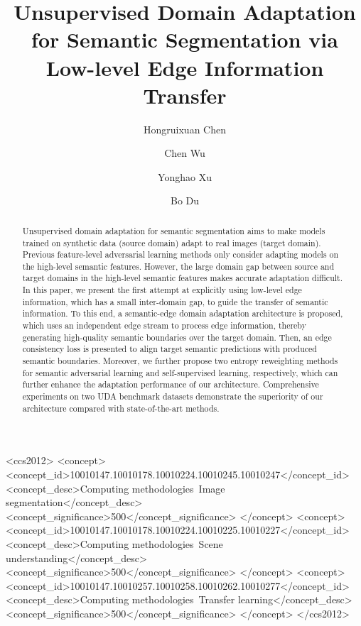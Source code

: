 \documentclass[sigconf]{acmart}
\begin{document}
\title{Unsupervised Domain Adaptation for Semantic Segmentation via Low-level Edge Information Transfer}

\author{Hongruixuan Chen}

\author{Chen Wu}

\author{Yonghao Xu}


\author{Bo Du}





\begin{abstract}
    Unsupervised domain adaptation for semantic segmentation aims to make models trained on synthetic data (source domain) adapt to real images (target domain). Previous feature-level adversarial learning methods only consider adapting models on the high-level semantic features. However, the large domain gap between source and target domains in the high-level semantic features makes accurate adaptation difficult. In this paper, we present the first attempt at explicitly using low-level edge information, which has a small inter-domain gap, to guide the transfer of semantic information. To this end, a semantic-edge domain adaptation architecture is proposed, which uses an independent edge stream to process edge information, thereby generating high-quality semantic boundaries over the target domain. Then, an edge consistency loss is presented to align target semantic predictions with produced semantic boundaries. Moreover, we further propose two entropy reweighting methods for semantic adversarial learning and self-supervised learning, respectively, which can further enhance the adaptation performance of our architecture. Comprehensive experiments on two UDA benchmark datasets demonstrate the superiority of our architecture compared with state-of-the-art methods. 
\end{abstract}






\begin{CCSXML}
<ccs2012>
   <concept>
       <concept_id>10010147.10010178.10010224.10010245.10010247</concept_id>
       <concept_desc>Computing methodologies~Image segmentation</concept_desc>
       <concept_significance>500</concept_significance>
       </concept>
   <concept>
       <concept_id>10010147.10010178.10010224.10010225.10010227</concept_id>
       <concept_desc>Computing methodologies~Scene understanding</concept_desc>
       <concept_significance>500</concept_significance>
       </concept>
   <concept>
       <concept_id>10010147.10010257.10010258.10010262.10010277</concept_id>
       <concept_desc>Computing methodologies~Transfer learning</concept_desc>
       <concept_significance>500</concept_significance>
       </concept>
 </ccs2012>
\end{CCSXML}
\end{document}
